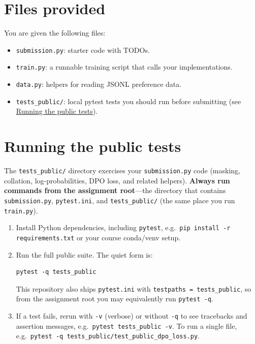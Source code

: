 \documentclass[11pt]{article}
\begin{document}
\section*{Files provided}

You are given the following files:
\begin{itemize}[itemsep=0.25em]
    \item \texttt{submission.py}: starter code with TODOs.
    \item \texttt{train.py}: a runnable training script that calls your implementations.
    \item \texttt{data.py}: helpers for reading JSONL preference data.
    \item \texttt{tests\_public/}: local pytest tests you should run before submitting (see \hyperref[sec:running-tests]{Running the public tests}).
\end{itemize}

\section*{Running the public tests}\label{sec:running-tests}

The \texttt{tests\_public/} directory exercises your \texttt{submission.py} code (masking, collation, log-probabilities, DPO loss, and related helpers).
\textbf{Always run commands from the assignment root}---the directory that contains \texttt{submission.py}, \texttt{pytest.ini}, and \texttt{tests\_public/} (the same place you run \texttt{train.py}).

\begin{enumerate}[itemsep=0.35em]
    \item Install Python dependencies, including \texttt{pytest}, e.g.\
          \texttt{pip install -r requirements.txt} or your course conda/venv setup.
    \item Run the full public suite. The quiet form is:
\begin{lstlisting}
pytest -q tests_public
\end{lstlisting}
          This repository also ships \texttt{pytest.ini} with \texttt{testpaths = tests\_public}, so from the assignment root you may equivalently run \texttt{pytest -q}.
    \item If a test fails, rerun with \texttt{-v} (verbose) or without \texttt{-q} to see tracebacks and assertion messages, e.g.\ \texttt{pytest tests\_public -v}.
          To run a single file, e.g.\ \texttt{pytest -q tests\_public/test\_public\_dpo\_loss.py}.
\end{enumerate}
\end{document}
